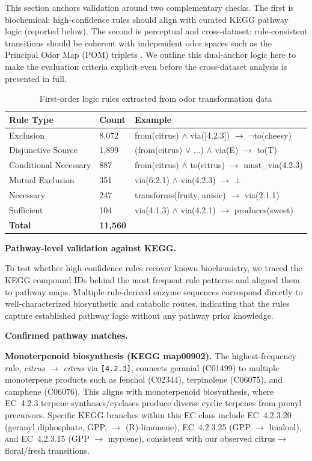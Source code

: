 \documentclass[a4paper,fleqn]{cas-sc}
\begin{document}
This section anchors validation around two complementary checks. The first is biochemical: high-confidence rules should align with curated KEGG pathway logic (reported below). The second is perceptual and cross-dataset: rule-consistent transitions should be coherent with independent odor spaces such as the Principal Odor Map (POM) triplets \citep{Lee2023}. We outline this dual-anchor logic here to make the evaluation criteria explicit even before the cross-dataset analysis is presented in full.

\begin{table}[pos=H]
\caption{First-order logic rules extracted from odor transformation data}\label{tbl:rules}
\begin{tabular*}{\tblwidth}{@{}LLL@{}}
\toprule
Rule Type & Count & Example \\
\midrule
Exclusion & 8,072 & from(citrus) $\wedge$ via([4.2.3]) $\rightarrow$ $\neg$to(cheesy) \\
Disjunctive Source & 1,899 & (from(citrus) $\vee$ ...) $\wedge$ via(E) $\rightarrow$ to(T) \\
Conditional Necessary & 887 & from(citrus) $\wedge$ to(citrus) $\rightarrow$ must\_via(4.2.3) \\
Mutual Exclusion & 351 & via(6.2.1) $\wedge$ via(4.2.3) $\rightarrow$ $\bot$ \\
Necessary & 247 & transforms(fruity, anisic) $\rightarrow$ via(2.1.1) \\
Sufficient & 104 & via(4.1.3) $\wedge$ via(4.2.1) $\rightarrow$ produces(sweet) \\
\midrule
\textbf{Total} & \textbf{11,560} & \\
\bottomrule
\end{tabular*}
\end{table}

\noindent\textbf{Pathway-level validation against KEGG.}\label{sec:kegg-validation}

To test whether high-confidence rules recover known biochemistry, we traced the KEGG compound IDs behind the most frequent rule patterns and aligned them to pathway maps. Multiple rule-derived enzyme sequences correspond directly to well-characterized biosynthetic and catabolic routes, indicating that the rules capture established pathway logic without any pathway prior knowledge.

 \noindent\textbf{Confirmed pathway matches.}

\noindent\textbf{Monoterpenoid biosynthesis (KEGG map00902).} The highest-frequency rule, \emph{citrus} $\rightarrow$ \emph{citrus} via \texttt{[4.2.3]}, connects geranial (C01499) to multiple monoterpene products such as fenchol (C02344), terpinolene (C06075), and camphene (C06076). This aligns with monoterpenoid biosynthesis, where EC~4.2.3 terpene synthases/cyclases produce diverse cyclic terpenes from prenyl precursors. Specific KEGG branches within this EC class include EC~4.2.3.20 (geranyl diphosphate, GPP, $\rightarrow$ (R)-limonene), EC~4.2.3.25 (GPP $\rightarrow$ linalool), and EC~4.2.3.15 (GPP $\rightarrow$ myrcene), consistent with our observed citrus$\rightarrow$floral/fresh transitions. \citep{Kanehisa2021,Tholl2015}
\end{document}
